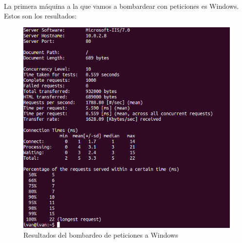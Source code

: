\begin{itemize}
	La primera máquina a la que vamos a bombardear con peticiones es Windows. Estos son los resultados:\\
	\begin{figure}[H]
		\centering
		\includegraphics[width=0.6\linewidth]{Windows-ab}
		\caption[Windows ab]{Resultados del bombardeo de peticiones a Windows}
		\label{fig:Windows-ab}
	\end{figure}
	

\end{itemize}
